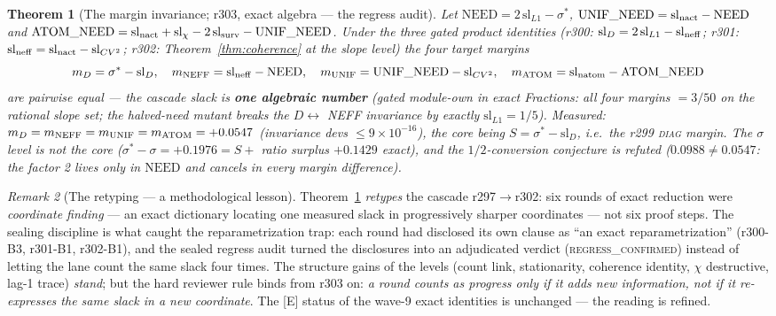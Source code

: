 \documentclass[11pt]{article}
\newtheorem{theorem}{Theorem}[section]
\theoremstyle{definition}
\theoremstyle{remark}
\newtheorem{remark}[theorem]{Remark}
\begin{document}
\begin{theorem}[The margin invariance; r303, exact algebra ---
the regress audit]\label{thm:margininv}
Let $\mathrm{NEED} = 2\,\mathrm{sl}_{L1} - \sigma^*$,
$\mathrm{UNIF\_NEED} = \mathrm{sl}_{\rm nact} - \mathrm{NEED}$ and
$\mathrm{ATOM\_NEED} = \mathrm{sl}_{\rm nact} + \mathrm{sl}_\chi -
2\,\mathrm{sl}_{\rm surv} - \mathrm{UNIF\_NEED}$.  Under the three
gated product identities (r300: $\mathrm{sl}_D = 2\,\mathrm{sl}_{L1}
- \mathrm{sl}_{\rm neff}$; r301: $\mathrm{sl}_{\rm neff} =
\mathrm{sl}_{\rm nact} - \mathrm{sl}_{CV^2}$; r302:
Theorem~\ref{thm:coherence} at the slope level) the four target
margins
\[
m_D = \sigma^* - \mathrm{sl}_D,\quad
m_{\rm NEFF} = \mathrm{sl}_{\rm neff} - \mathrm{NEED},\quad
m_{\rm UNIF} = \mathrm{UNIF\_NEED} - \mathrm{sl}_{CV^2},\quad
m_{\rm ATOM} = \mathrm{sl}_{\rm natom} - \mathrm{ATOM\_NEED}
\]
are pairwise \emph{equal} --- the cascade slack is \textbf{one
algebraic number} (gated module-own in exact Fractions: all four
margins $= 3/50$ on the rational slope set; the halved-need mutant
breaks the $D \leftrightarrow$ NEFF invariance by exactly
$\mathrm{sl}_{L1} = 1/5$).  Measured: $m_D = m_{\rm NEFF} = m_{\rm
UNIF} = m_{\rm ATOM} = +0.0547$ (invariance devs $\le
9\times10^{-16}$), the core being $S = \sigma^* - \mathrm{sl}_D$,
i.e.\ the r299 \textsc{diag} margin.  The $\sigma$ level is
\emph{not} the core ($\sigma^* - \sigma = +0.1976 = S + $ ratio
surplus $+0.1429$ exact), and the $1/2$-conversion conjecture is
\emph{refuted} ($0.0988 \ne 0.0547$: the factor 2 lives only in
$\mathrm{NEED}$ and cancels in every margin difference).
\end{theorem}

\begin{remark}[The retyping --- a methodological lesson]
\label{rem:retyping}
Theorem~\ref{thm:margininv} \emph{retypes} the cascade
r297$\to$r302: six rounds of exact reduction were \emph{coordinate
finding} --- an exact dictionary locating one measured slack in
progressively sharper coordinates --- not six proof steps.  The
sealing discipline is what caught the reparametrization trap: each
round had disclosed its own clause as ``an exact reparametrization''
(r300-B3, r301-B1, r302-B1), and the sealed regress audit turned the
disclosures into an adjudicated verdict (\textsc{regress\_confirmed})
instead of letting the lane count the same slack four times.  The
structure gains of the levels (count link, stationarity, coherence
identity, $\chi$ destructive, lag-1 trace) \emph{stand}; but the hard
reviewer rule binds from r303 on: \emph{a round counts as progress
only if it adds new information, not if it re-expresses the same
slack in a new coordinate}.  The [E] status of the wave-9 exact
identities is unchanged --- the reading is refined.
\end{remark}
\end{document}
